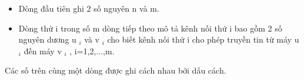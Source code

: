 \begin{itemize}
	\item     Dòng đầu tiên ghi 2 số nguyên n và m.   
	\item     Dòng thứ i trong số m dòng tiếp theo mô tả kênh nối thứ i bao gồm 2 số nguyên dương u    $_     i    $    và v    $_     i    $    cho biết kênh nối thứ i cho phép truyền tin từ máy u    $_     i    $    đến máy v    $_     i    $    , i=1,2,...,m.   
\end{itemize}

   Các số trên cùng một dòng được ghi cách nhau bởi dấu cách.